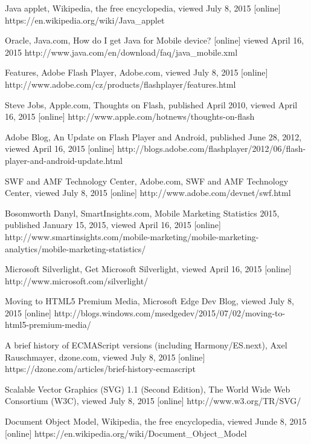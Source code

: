 \begin{thebibliography}{99}

Java applet, Wikipedia, the free encyclopedia, viewed July 8, 2015 [online]
https://en.wikipedia.org/wiki/Java\_applet

Oracle, Java.com, How do I get Java for Mobile device? [online] viewed April 16, 2015
http://www.java.com/en/download/faq/java\_mobile.xml

Features, Adobe Flash Player, Adobe.com, viewed July 8, 2015 [online]
http://www.adobe.com/cz/products/flashplayer/features.html

Steve Jobs, Apple.com, Thoughts on Flash, published April 2010, viewed April 16, 2015 [online]
http://www.apple.com/hotnews/thoughts-on-flash

Adobe Blog, An Update on Flash Player and Android, published June 28, 2012, viewed April 16, 2015 [online]
http://blogs.adobe.com/flashplayer/2012/06/flash-player-and-android-update.html

SWF and AMF Technology Center, Adobe.com, SWF and AMF Technology Center, viewed July 8, 2015 [online]
http://www.adobe.com/devnet/swf.html

Bosomworth Danyl, SmartInsights.com, Mobile Marketing Statistics 2015, published January 15, 2015, viewed April 16, 2015 [online]
http://www.smartinsights.com/mobile-marketing/mobile-marketing-analytics/mobile-marketing-statistics/

Microsoft Silverlight, Get Microsoft Silverlight, viewed April 16, 2015 [online]
http://www.microsoft.com/silverlight/

Moving to HTML5 Premium Media, Microsoft Edge Dev Blog, viewed July 8, 2015 [online]
http://blogs.windows.com/msedgedev/2015/07/02/moving-to-html5-premium-media/

A brief history of ECMAScript versions (including Harmony/ES.next),  Axel Rauschmayer, dzone.com, viewed July 8, 2015 [online]
https://dzone.com/articles/brief-history-ecmascript

Scalable Vector Graphics (SVG) 1.1 (Second Edition), The World Wide Web Consortium (W3C), viewed July 8, 2015 [online]
http://www.w3.org/TR/SVG/

Document Object Model, Wikipedia, the free encyclopedia, viewed Junde 8, 2015 [online]
https://en.wikipedia.org/wiki/Document\_Object\_Model


\end{thebibliography}
